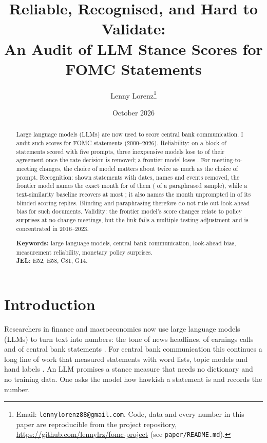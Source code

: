 \documentclass[11pt]{article}
\title{Reliable, Recognised, and Hard to Validate:\\ An Audit of LLM Stance Scores for FOMC Statements}
\author{Lenny Lorenz\thanks{Email: \texttt{lennylorenz88@gmail.com}. Code, data and every number in
this paper are reproducible from the project repository,
\url{https://github.com/lennylrz/fomc-project} (see \texttt{paper/README.md}).}}
\date{October 2026}
\begin{document}
\maketitle

\begin{abstract}
\noindent Large language models (LLMs) are now used to score central bank communication. I audit such
scores for FOMC statements (2000--2026). Reliability: on a block of  statements scored with
five prompts, three inexpensive models lose  to  of their agreement
once the rate decision is removed; a frontier model loses . For meeting-to-meeting
changes, the choice of model matters about twice as much as the choice of prompt. Recognition: shown
statements with dates, names and events removed, the frontier model names the exact month for
 of them ( of a paraphrased sample), while a
text-similarity baseline recovers at most ; it also names the month unprompted in
 of its blinded scoring replies. Blinding and paraphrasing therefore do not
rule out look-ahead bias for such documents. Validity: the frontier model's score changes relate to policy
surprises at no-change meetings, but the link fails a multiple-testing adjustment and is concentrated in
2016--2023.

\medskip\noindent\textbf{Keywords:} large language models, central bank communication, look-ahead bias,
measurement reliability, monetary policy surprises.\\
\textbf{JEL:} E52, E58, C81, G14.
\end{abstract}

\newpage
\section{Introduction}\label{sec:intro}

Researchers in finance and macroeconomics now use large language models (LLMs) to turn text into numbers:
the tone of news headlines, of earnings calls and of central bank statements
\citep{lopezlira2023,hansen2024kazinnik,shah2023}. For central bank communication this continues a long
line of work that measured statements with word lists, topic models and hand labels
\citep{lucca2009,apel2012,hansen2016,gardner2022}. An LLM promises a stance measure that needs no
dictionary and no training data. One asks the model how hawkish a statement is and records the number.
\end{document}

